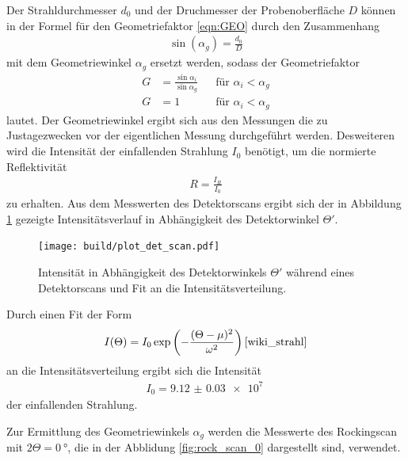 Der Strahldurchmesser $d_0$ und der Druchmesser der Probenoberfläche $D$ können in der Formel für den Geometriefaktor \eqref{eqn:GEO}
durch den Zusammenhang
\begin{align}
   \sin(\alpha_g) = \frac{d_0}{D}
\end{align}
mit dem Geometriewinkel $\alpha_g$ ersetzt werden, sodass der Geometriefaktor
\begin{align}
  G&=\frac{\sin\alpha_i}{\sin\alpha_g} &  &\text{für } \alpha_i<\alpha_g \label{eqn:GEO_neu}\\
  G&=1 & &\text{für } \alpha_i<\alpha_g
\end{align}
lautet.
Der Geometriewinkel ergibt sich aus den Messungen die zu Justagezwecken vor der eigentlichen Messung durchgeführt werden.
Desweiteren wird die Intensität der einfallenden Strahlung $I_0$ benötigt, um die normierte Reflektivität
\begin{align}
  R=\frac{I_R}{I_0}
\end{align}
zu erhalten.
Aus dem Messwerten des Detektorscans ergibt sich der in Abbildung \ref{fig:det_scan}
gezeigte Intensitätsverlauf in Abhängigkeit des Detektorwinkel $\Theta'$.

\begin{figure}
  \centering
  \texttt{[image: build/plot\_det\_scan.pdf]}
  \caption{Intensität in Abhängigkeit des Detektorwinkels $\Theta'$ während eines Detektorscans und Fit an die Intensitätsverteilung.}
  \label{fig:det_scan}
\end{figure}

Durch einen Fit der Form
\begin{align}
  I(\Theta) =  I_0 \exp\left(-\frac{(\Theta-\mu)^2}{\omega^2}\right) \text{\cite{wiki_strahl}}
\end{align}
an die Intensitätsverteilung ergibt sich die Intensität
\begin{align}
  I_0 = \SI{9.12(3)e7}{}
  \label{eqn:I_0}
\end{align}
der einfallenden Strahlung.

Zur Ermittlung des Geometriewinkels  $\alpha_g$ werden die Messwerte
des Rockingscan mit $2\Theta = \SI{0}{\degree}$, die in der Abblidung \ref{fig:rock_scan_0}
dargestellt sind, verwendet.


